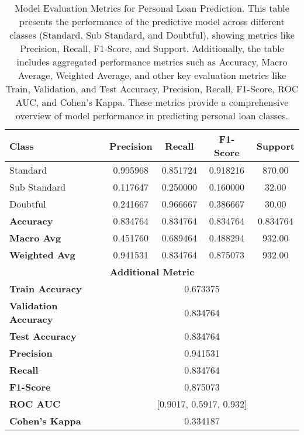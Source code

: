 \documentclass[a4paper]{article}
\begin{document}
\begin{table}[h]
	\centering
	\begin{minipage}{0.8\textwidth}  %
	\caption{Model Evaluation Metrics for Personal Loan Prediction. This table presents the performance of the predictive model across different classes (Standard, Sub Standard, and Doubtful), showing metrics like Precision, Recall, F1-Score, and Support. Additionally, the table includes aggregated performance metrics such as Accuracy, Macro Average, Weighted Average, and other key evaluation metrics like Train, Validation, and Test Accuracy, Precision, Recall, F1-Score, ROC AUC, and Cohen's Kappa. These metrics provide a comprehensive overview of model performance in predicting personal loan classes.}
	\begin{tabular}{|l|c|c|c|c|}
		\hline
		\textbf{Class} & \textbf{Precision} & \textbf{Recall} & \textbf{F1-Score} & \textbf{Support} \\ 
		\hline
		Standard       & 0.995968          & 0.851724        & 0.918216          & 870.00        \\ 
		Sub Standard   & 0.117647          & 0.250000        & 0.160000          & 32.00         \\ 
		Doubtful       & 0.241667          & 0.966667        & 0.386667          & 30.00         \\ 
		\hline
		\textbf{Accuracy}        & 0.834764 & 0.834764 & 0.834764 & 0.834764 \\ 
		\textbf{Macro Avg}      & 0.451760 & 0.689464 & 0.488294 & 932.00 \\ 
		\textbf{Weighted Avg}   & 0.941531 & 0.834764 & 0.875073 & 932.00 \\ 
		\hline
		\multicolumn{5}{|c|}{\textbf{Additional Metric}}  \\ 
		\hline
		\textbf{Train Accuracy}            & \multicolumn{4}{c|}{0.673375} \\ 
		\textbf{Validation Accuracy}       & \multicolumn{4}{c|}{0.834764} \\ 
		\textbf{Test Accuracy}             & \multicolumn{4}{c|}{0.834764} \\ 
		\textbf{Precision}                 & \multicolumn{4}{c|}{0.941531} \\ 
		\textbf{Recall}                    & \multicolumn{4}{c|}{0.834764} \\ 
		\textbf{F1-Score}                  & \multicolumn{4}{c|}{0.875073} \\ 
		\textbf{ROC AUC}                   & \multicolumn{4}{c|}{[0.9017, 0.5917, 0.932]} \\ 
		\textbf{Cohen’s Kappa}             & \multicolumn{4}{c|}{0.334187} \\ 
		\hline
	\end{tabular}
	\label{tab:model_metrics_personal}
\end{minipage}
\end{table}
\end{document}
